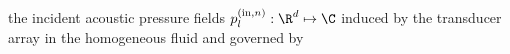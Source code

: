 the incident acoustic pressure fields
$p_{l}^{(\text{in}, n)}: \R^{d} \mapsto \C$ induced by
the transducer array in
the homogeneous fluid and governed by
